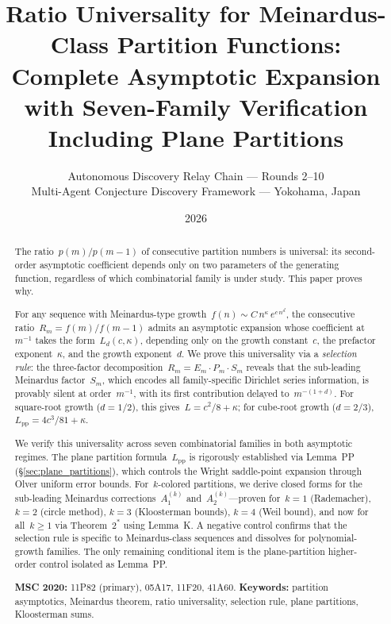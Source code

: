 \documentclass[11pt,a4paper]{article}
\title{Ratio Universality for Meinardus-Class Partition Functions:\\[4pt]
\large Complete Asymptotic Expansion with Seven-Family Verification\\
Including Plane Partitions}
\author{Autonomous Discovery Relay Chain --- Rounds 2--10\\
\small Multi-Agent Conjecture Discovery Framework --- Yokohama, Japan}
\date{2026}
\begin{document}
\maketitle

\begin{abstract}
The ratio~$p(m)/p(m-1)$ of consecutive partition numbers is universal: its second-order asymptotic coefficient depends only on two parameters of the generating function, regardless of which combinatorial family is under study. This paper proves why.

For any sequence with Meinardus-type growth~$f(n) \sim C\,n^{\kappa}\,e^{c\,n^d}$, the consecutive ratio~$R_m = f(m)/f(m-1)$ admits an asymptotic expansion whose coefficient at~$m^{-1}$ takes the form~$L_d(c,\kappa)$, depending only on the growth constant~$c$, the prefactor exponent~$\kappa$, and the growth exponent~$d$. We prove this universality via a \emph{selection rule}: the three-factor decomposition~$R_m = E_m \cdot P_m \cdot S_m$ reveals that the sub-leading Meinardus factor~$S_m$, which encodes all family-specific Dirichlet series information, is provably silent at order~$m^{-1}$, with its first contribution delayed to~$m^{-(1+d)}$. For square-root growth ($d=1/2$), this gives~$L = c^2/8 + \kappa$; for cube-root growth ($d=2/3$), $L_{\mathrm{pp}} = 4c^3/81 + \kappa$.

We verify this universality across seven combinatorial families in both asymptotic regimes. The plane partition formula~$L_{\mathrm{pp}}$ is rigorously established via Lemma~PP (\S\ref{sec:plane_partitions}), which controls the Wright saddle-point expansion through Olver uniform error bounds. For~$k$-colored partitions, we derive closed forms for the sub-leading Meinardus corrections~$A_1^{(k)}$ and~$A_2^{(k)}$---proven for~$k = 1$ (Rademacher), $k = 2$ (circle method), $k = 3$ (Kloosterman bounds), $k = 4$ (Weil bound), and now for all~$k \ge 1$ via Theorem~$2^*$ using Lemma~K. A negative control confirms that the selection rule is specific to Meinardus-class sequences and dissolves for polynomial-growth families. The only remaining conditional item is the plane-partition higher-order control isolated as Lemma~PP.

\medskip\noindent
\textbf{MSC 2020:} 11P82 (primary), 05A17, 11F20, 41A60.
\quad
\textbf{Keywords:} partition asymptotics, Meinardus theorem, ratio universality, selection rule, plane partitions, Kloosterman sums.
\end{abstract}
\end{document}
